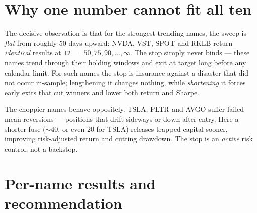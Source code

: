 \documentclass[11pt]{article}
\begin{document}
\section{Why one number cannot fit all ten}

The decisive observation is that for the strongest trending names, the sweep is
\emph{flat} from roughly 50 days upward: NVDA, VST, SPOT and RKLB return \emph{identical}
results at \texttt{T2}~$=50,75,90,\dots,\infty$. The stop simply never binds --- these names
trend through their holding windows and exit at target long before any calendar limit.
For such names the stop is insurance against a disaster that did not occur in-sample;
lengthening it changes nothing, while \emph{shortening} it forces early exits that cut
winners and lower both return and Sharpe.

The choppier names behave oppositely. TSLA, PLTR and AVGO suffer failed mean-reversions ---
positions that drift sideways or down after entry. Here a shorter fuse ($\sim$40, or even 20
for TSLA) releases trapped capital sooner, improving risk-adjusted return and cutting
drawdown. The stop is an \emph{active} risk control, not a backstop.

\section{Per-name results and recommendation}
\end{document}
